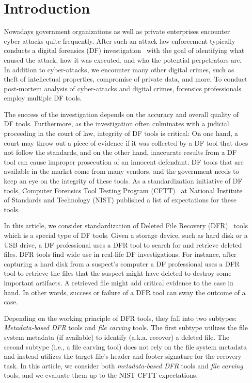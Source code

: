 \section{Introduction}\label{intro}

Nowadays government organizations as well as private enterprises encounter cyber-attacks quite frequently.
After such an attack law enforcement typically conducts a digital forensics (DF) investigation~\cite{df:news} \morecite 
with the goal of identifying what caused the attack, how it was executed, and who the potential perpetrators are. 
In addition to cyber-attacks, we encounter many other digital crimes, such as theft of intellectual properties, 
compromise of private data, and more. To conduct post-mortem analysis of cyber-attacks and digital crimes, forensics professionals
employ multiple DF tools. 

The success of the investigation depends on the accuracy and overall quality of DF tools.
Furthermore, as the investigation often culminates with a judicial proceeding in the court of law, integrity of DF tools 
is critical: On one hand, a court may throw out a piece of evidence if it was collected by a DF tool that does not follow the standards, 
and on the other hand, inaccurate results from a DF tool can cause improper prosecution of an innocent defendant. 
DF tools that are available in the market come from many vendors, and the government needs to keep an eye on the integrity of these tools. 
As a standardization initiative of DF tools,  Computer Forensics Tool Testing Program (CFTT)~\cite{cftt:nist} 
at National Institute of Standards and Technology (NIST) published a list of expectations for these tools. 

In this article, we consider standardization of Deleted File Recovery (DFR)~\cite{meta:dfr:standards} \morecite tools which is a special type of DF tools. 
Given a storage device, such as hard disk or a USB drive, a DF professional uses a DFR tool to search for and retrieve deleted files.
DFR tools find wide use in real-life DF investigations. For instance, after capturing a hard disk from a suspect's computer a
DF professional uses a DFR tool to retrieve the files that the suspect might have deleted to destroy some important artifacts.
A retrieved file might add critical evidence to the case in hand. In other words, success or failure of a DFR tool can sway the outcome of a case.

Depending on the working principle of DFR tools, they fall into two subtypes: \emph{Metadata-based DFR} tools and \emph{file carving} tools.
The first subtype utilizes the file system metadata (if available) to identify (a.k.a. recover) a deleted file. 
The second subtype (i.e., a file carving tool) does not rely on the file system metadata and instead utilizes the target file's 
header and footer signature for the recovery task. 
In this article, we consider both \emph{metadata-based DFR} tools and \emph{file carving} tools, and we evaluate them up to the NIST CFTT expectations.       

